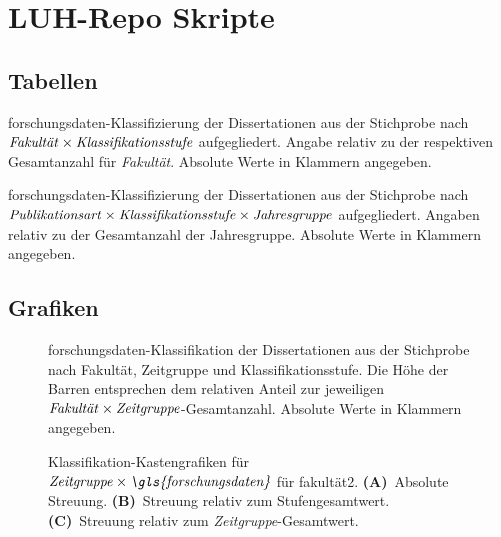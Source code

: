 \chapter{LUH-Repo Skripte}
\section{Tabellen}
\begin{table}[!htbp]
	\caption{\gls{forschungsdaten}-Klassifizierung der Dissertationen aus der Stichprobe nach $\text{\textit{Fakultät}}\times\text{\textit{Klassifikationsstufe}}$ aufgegliedert.
    Angabe relativ zu der respektiven Gesamtanzahl für \textit{Fakultät}.
    Absolute Werte in Klammern angegeben.}
    
    \label{tab:luh-repo-classification-general-all-faculty}
\end{table}

\begin{table}[!htbp]
	\caption{\gls{forschungsdaten}-Klassifizierung der Dissertationen aus der Stichprobe nach $\text{\textit{Publikationsart}}\times\text{\textit{Klassifikationsstufe}}\times\text{\textit{Jahresgruppe}}$ aufgegliedert.
    Angaben relativ zu der Gesamtanzahl der Jahresgruppe.
    Absolute Werte in Klammern angegeben.}
    
    \label{tab:luh-repo-classification-general-publication}
\end{table}
\section{Grafiken}
\begin{figure}[!htbp]
    \resizebox{\ifdim\width>\textwidth\textwidth\else\width\fi}{!}{}
    \caption{\gls{forschungsdaten}-Klassifikation der Dissertationen aus der Stichprobe nach Fakultät, Zeitgruppe und Klassifikationsstufe.
    Die Höhe der Barren entsprechen dem relativen Anteil zur jeweiligen $\text{\textit{Fakultät}}\times\text{\textit{Zeitgruppe}}$-Gesamtanzahl.
    Absolute Werte in Klammern angegeben.}
    \label{fig:luh-repo-faculty-yeargroup-classification}
    \end{figure}

    \begin{figure}[!htbp]
        \centering%
        \resizebox{.33\textwidth}{!}{}%
        \resizebox{.33\textwidth}{!}{}%
        \resizebox{.33\textwidth}{!}{}%
        \caption{Klassifikation-Kastengrafiken für $\text{\textit{Zeitgruppe}}\times\text{\textit{\gls{forschungsdaten}}}$ für \gls{fakultät2}. \textbf{(A)}~Absolute Streuung. \textbf{(B)}~Streuung relativ zum Stufengesamtwert. \textbf{(C)}~Streuung relativ zum \textit{Zeitgruppe}-Gesamtwert.}
        \label{fig:faculty_a_sampled_evaluated_factors-only_Zeitgruppe_x_FD_absolute_boxplot}
    \end{figure}


